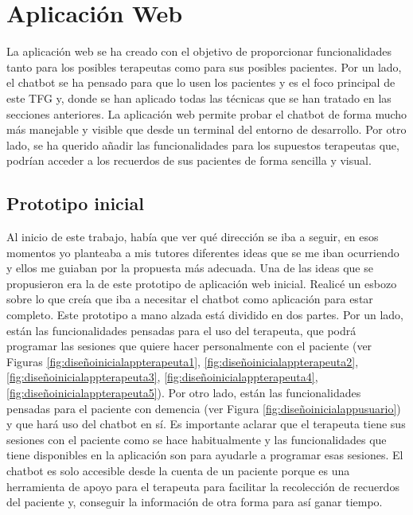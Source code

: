 \chapter{Aplicación Web}
\label{cap:aplicacionWeb}

La aplicación web se ha creado con el objetivo de proporcionar funcionalidades tanto para los posibles terapeutas como para sus posibles pacientes. Por un lado, el chatbot se ha pensado para que lo usen los pacientes y es el foco principal de este TFG y, donde se han aplicado todas las técnicas que se han tratado en las secciones anteriores. La aplicación web permite probar el chatbot de forma mucho más manejable y visible que desde un terminal del entorno de desarrollo. Por otro lado, se ha querido añadir las funcionalidades para los supuestos terapeutas que, podrían acceder a los recuerdos de sus pacientes de forma sencilla y visual.


\section{Prototipo inicial}

Al inicio de este trabajo, había que ver qué dirección se iba a seguir, en esos momentos yo planteaba a mis tutores diferentes ideas que se me iban ocurriendo y ellos me guiaban por la propuesta más adecuada. Una de las ideas que se propusieron era la de este prototipo de aplicación web inicial. Realicé un esbozo sobre lo que creía que iba a necesitar el chatbot como aplicación para estar completo. Este prototipo a mano alzada está dividido en dos partes. Por un lado, están las funcionalidades pensadas para el uso del terapeuta, que podrá programar las sesiones que quiere hacer personalmente con el paciente (ver Figuras \ref{fig:diseñoinicialappterapeuta1}, \ref{fig:diseñoinicialappterapeuta2}, \ref{fig:diseñoinicialappterapeuta3}, \ref{fig:diseñoinicialappterapeuta4}, \ref{fig:diseñoinicialappterapeuta5}). Por otro lado, están las funcionalidades pensadas para el paciente con demencia (ver Figura \ref{fig:diseñoinicialappusuario}) y que hará uso del chatbot en sí. Es importante aclarar que el terapeuta tiene sus sesiones con el paciente como se hace habitualmente y las funcionalidades que tiene disponibles en la aplicación son para ayudarle a programar esas sesiones. El chatbot es solo accesible desde la cuenta de un paciente porque es una herramienta de apoyo para el terapeuta para facilitar la recolección de recuerdos del paciente y, conseguir la información de otra forma para así ganar tiempo.

